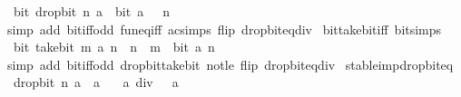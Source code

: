 \begin{isabellebody}
\ \ {\isacartoucheopen}bit\ {\isacharparenleft}{\kern0pt}drop{\isacharunderscore}{\kern0pt}bit\ n\ a{\isacharparenright}{\kern0pt}\ {\isacharequal}{\kern0pt}\ bit\ a\ {\isasymcirc}\ {\isacharparenleft}{\kern0pt}{\isacharplus}{\kern0pt}{\isacharparenright}{\kern0pt}\ n{\isacartoucheclose}\isanewline
%
\isadelimproof
\ \ %
\endisadelimproof
%
\isatagproof
{}\isamarkupfalse%
\ {\isacharparenleft}{\kern0pt}simp\ add{\isacharcolon}{\kern0pt}\ bit{\isacharunderscore}{\kern0pt}iff{\isacharunderscore}{\kern0pt}odd\ fun{\isacharunderscore}{\kern0pt}eq{\isacharunderscore}{\kern0pt}iff\ ac{\isacharunderscore}{\kern0pt}simps\ flip{\isacharcolon}{\kern0pt}\ drop{\isacharunderscore}{\kern0pt}bit{\isacharunderscore}{\kern0pt}eq{\isacharunderscore}{\kern0pt}div{\isacharparenright}{\kern0pt}%
\endisatagproof
{\isafoldproof}%
%
\isadelimproof
\isanewline
%
\endisadelimproof
\isanewline
{}\isamarkupfalse%
\ bit{\isacharunderscore}{\kern0pt}take{\isacharunderscore}{\kern0pt}bit{\isacharunderscore}{\kern0pt}iff\ {\isacharbrackleft}{\kern0pt}bit{\isacharunderscore}{\kern0pt}simps{\isacharbrackright}{\kern0pt}{\isacharcolon}{\kern0pt}\isanewline
\ \ {\isacartoucheopen}bit\ {\isacharparenleft}{\kern0pt}take{\isacharunderscore}{\kern0pt}bit\ m\ a{\isacharparenright}{\kern0pt}\ n\ {\isasymlongleftrightarrow}\ n\ {\isacharless}{\kern0pt}\ m\ {\isasymand}\ bit\ a\ n{\isacartoucheclose}\isanewline
%
\isadelimproof
\ \ %
\endisadelimproof
%
\isatagproof
{}\isamarkupfalse%
\ {\isacharparenleft}{\kern0pt}simp\ add{\isacharcolon}{\kern0pt}\ bit{\isacharunderscore}{\kern0pt}iff{\isacharunderscore}{\kern0pt}odd\ drop{\isacharunderscore}{\kern0pt}bit{\isacharunderscore}{\kern0pt}take{\isacharunderscore}{\kern0pt}bit\ not{\isacharunderscore}{\kern0pt}le\ flip{\isacharcolon}{\kern0pt}\ drop{\isacharunderscore}{\kern0pt}bit{\isacharunderscore}{\kern0pt}eq{\isacharunderscore}{\kern0pt}div{\isacharparenright}{\kern0pt}%
\endisatagproof
{\isafoldproof}%
%
\isadelimproof
\isanewline
%
\endisadelimproof
\isanewline
{}\isamarkupfalse%
\ stable{\isacharunderscore}{\kern0pt}imp{\isacharunderscore}{\kern0pt}drop{\isacharunderscore}{\kern0pt}bit{\isacharunderscore}{\kern0pt}eq{\isacharcolon}{\kern0pt}\isanewline
\ \ {\isacartoucheopen}drop{\isacharunderscore}{\kern0pt}bit\ n\ a\ {\isacharequal}{\kern0pt}\ a{\isacartoucheclose}\isanewline
\ \ \ {\isacartoucheopen}a\ div\ {}\ {\isacharequal}{\kern0pt}\ a{\isacartoucheclose}\isanewline
%
\isadelimproof
\ \ %
\endisadelimproof
%
\isatagproof
{}\isamarkupfalse%

\end{isabellebody}

